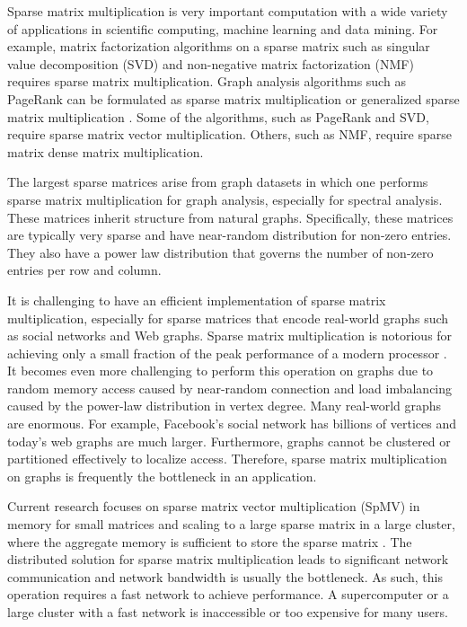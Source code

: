 Sparse matrix multiplication is very important computation with a wide variety
of applications in scientific computing, machine learning and data mining.
For example, matrix factorization algorithms on a sparse matrix such as
singular value decomposition (SVD) \cite{svd} and non-negative matrix
factorization (NMF) \cite{nmf} requires sparse matrix multiplication.
Graph analysis algorithms such as PageRank \cite{pagerank} can be
formulated as sparse matrix multiplication or generalized sparse matrix
multiplication \cite{Mattson13}. Some of
the algorithms, such as PageRank and SVD, require sparse matrix vector
multiplication. Others, such as NMF, require sparse matrix dense
matrix multiplication.

The largest sparse matrices arise from graph datasets in which one performs
sparse matrix multiplication for graph analysis, especially for spectral
analysis. These matrices inherit structure from natural graphs. Specifically,
these matrices are typically very sparse and have near-random distribution
for non-zero entries. They also have a power law distribution that governs
the number of non-zero entries per row and column.


It is challenging to have an efficient implementation of sparse matrix
multiplication, especially for sparse matrices that encode real-world graphs
such as social networks
and Web graphs. Sparse matrix multiplication is notorious for achieving only
a small fraction of the peak performance of a modern processor \cite{Williams07}.
It becomes even more challenging to perform this operation on graphs due to
random memory access caused by near-random connection and load imbalancing
caused by the power-law distribution in vertex degree. Many real-world graphs
are enormous. For example, Facebook's social network has billions of vertices
and today's web graphs are much larger. Furthermore, graphs cannot be
clustered or partitioned effectively \cite{leskovec} to localize access.
Therefore, sparse matrix multiplication on graphs is frequently the bottleneck
in an application.

Current research focuses on sparse matrix vector multiplication (SpMV) in memory
for small matrices and scaling to a large sparse matrix in a large cluster,
where the aggregate memory is sufficient to store the sparse matrix
\cite{Williams07, Yoo11, Boman2013}.
The distributed solution for sparse matrix multiplication leads to significant
network communication and network bandwidth is usually the bottleneck.
As such, this operation requires a fast network to achieve performance.
A supercomputer or a large cluster with a fast network is inaccessible or
too expensive for many users.

